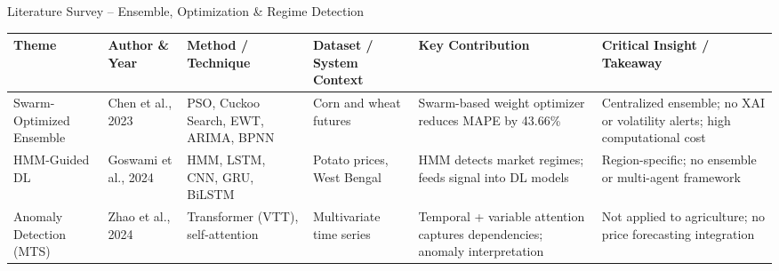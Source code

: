 \documentclass{beamer}
\begin{document}
\begin{frame}[label=lit_ens]{Literature Survey -- Ensemble, Optimization \& Regime Detection}
\hypertarget{lit_anom}{}%
\setlength{\tabcolsep}{2pt}
\renewcommand{\arraystretch}{1.3}
\tiny

\begin{tcolorbox}[enhanced, colback=white, colframe=accentpurple!40, arc=4pt, boxrule=0.3pt,
  left=1pt, right=1pt, top=2pt, bottom=2pt, shadow={1pt}{-1pt}{0pt}{black!10}]
\begin{adjustbox}{max width=\textwidth, max height=0.7\textheight}
\begin{tabular}{|L{1.5cm}|L{1.4cm}|L{1.6cm}|L{1.8cm}|L{2.0cm}|L{2.3cm}|}
\hline
{}
\textbf{Theme} & \textbf{Author \& Year} & \textbf{Method / Technique} & \textbf{Dataset / System Context} & \textbf{Key Contribution} & \textbf{Critical Insight / Takeaway} \\
\hline
Swarm-Optimized Ensemble & Chen et al., 2023 & PSO, Cuckoo Search, EWT, ARIMA, BPNN & Corn and wheat futures & Swarm-based weight optimizer reduces MAPE by 43.66\% & Centralized ensemble; no XAI or volatility alerts; high computational cost \\ \hline
HMM-Guided DL & Goswami et al., 2024 & HMM, LSTM, CNN, GRU, BiLSTM & Potato prices, West Bengal & HMM detects market regimes; feeds signal into DL models & Region-specific; no ensemble or multi-agent framework \\ \hline
Anomaly Detection (MTS) & Zhao et al., 2024 & Transformer (VTT), self-attention & Multivariate time series & Temporal + variable attention captures dependencies; anomaly interpretation & Not applied to agriculture; no price forecasting integration \\ \hline
\end{tabular}
\end{adjustbox}
\end{tcolorbox}

\end{frame}


\end{document}
